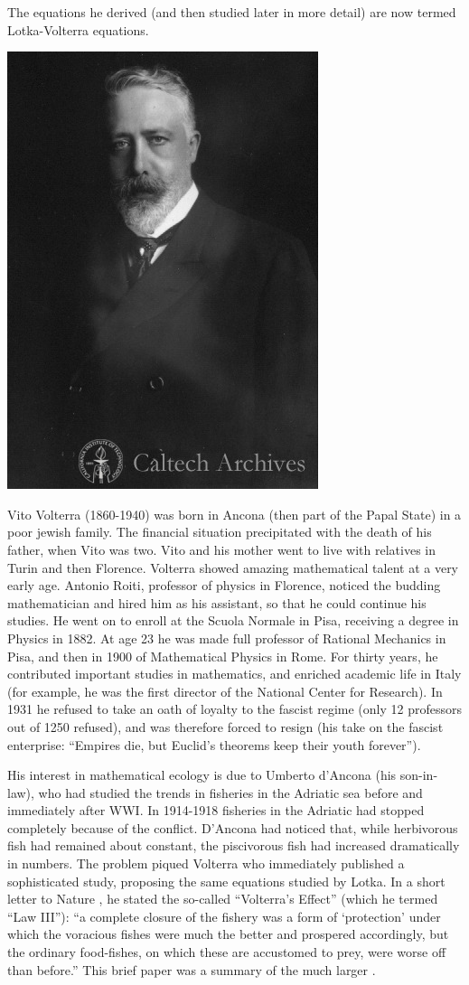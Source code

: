 \documentclass[]{book}
\begin{document}
The equations he derived (and then studied later in more detail) are now termed Lotka-Volterra equations.

\begin{center}\includegraphics[width=0.25\linewidth]{images/Volterra} \end{center}

Vito Volterra (1860-1940) was born in Ancona (then part of the Papal State) in a poor jewish family. The financial situation precipitated with the death of his father, when Vito was two. Vito and his mother went to live with relatives in Turin and then Florence. Volterra showed amazing mathematical talent at a very early age. Antonio Roiti, professor of physics in Florence, noticed the budding mathematician and hired him as his assistant, so that he could continue his studies. He went on to enroll at the Scuola Normale in Pisa, receiving a degree in Physics in 1882. At age 23 he was made full professor of Rational Mechanics in Pisa, and then in 1900 of Mathematical Physics in Rome. For thirty years, he contributed important studies in mathematics, and enriched academic life in Italy (for example, he was the first director of the National Center for Research). In 1931 he refused to take an oath of loyalty to the fascist regime (only 12 professors out of 1250 refused), and was therefore forced to resign (his take on the fascist enterprise: ``Empires die, but Euclid's theorems keep their youth forever'').

His interest in mathematical ecology is due to Umberto d'Ancona (his son-in-law), who had studied the trends in fisheries in the Adriatic sea before and immediately after WWI. In 1914-1918 fisheries in the Adriatic had stopped completely because of the conflict. D'Ancona had noticed that, while herbivorous fish had remained about constant, the piscivorous fish had increased dramatically in numbers. The problem piqued Volterra who immediately published a sophisticated study, proposing the same equations studied by Lotka. In a short letter to Nature \citep{volterra1926fluctuations}, he stated the so-called ``Volterra's Effect'' (which he termed ``Law III''): ``a complete closure of the fishery was a form of `protection' under which the voracious fishes were much the better and prospered accordingly, but the ordinary food-fishes, on which these are accustomed to prey, were worse off than before.'' This brief paper was a summary of the much larger \citet{volterra1926variazioni}.
\end{document}

